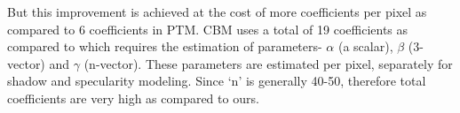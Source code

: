 But this improvement is achieved at the cost of more coefficients per pixel as compared to 6 coefficients in PTM.
CBM uses a total of 19 coefficients as compared to \cite{A10} which requires the estimation of parameters- $\alpha$ (a scalar), 
$\beta$ (3-vector) and $\gamma$ (n-vector). These parameters are estimated per pixel, separately for shadow and specularity
modeling. Since `n' is generally 40-50, therefore total coefficients are very high as compared to ours.


